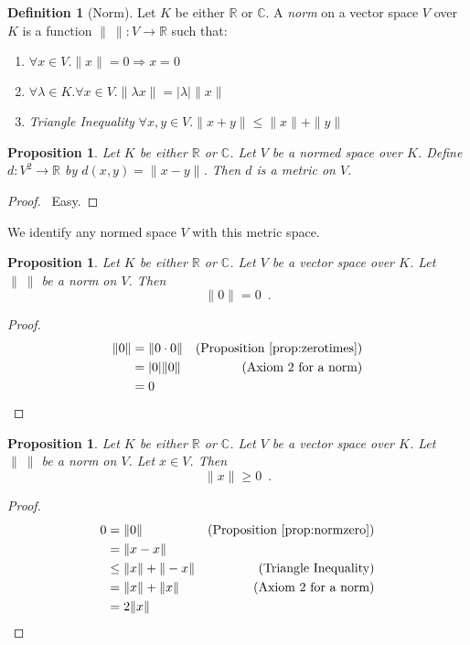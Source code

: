 \documentclass{book}
\let\qed\relax
\newtheorem{prop}[ax]{Proposition}
\theoremstyle{definition}
\newtheorem{df}[ax]{Definition}
\begin{document}
\begin{df}[Norm]
Let $K$ be either $\mathbb{R}$ or $\mathbb{C}$.
A \emph{norm} on a vector space $V$ over $K$ is a function $\| \ \| : V \rightarrow \mathbb{R}$ such that:
\begin{enumerate}
\item $\forall x \in V. \| x \| = 0 \Rightarrow x = 0$
\item $\forall \lambda \in K. \forall x \in V. \| \lambda x \| = |\lambda| \| x \|$
\item \emph{Triangle Inequality} $\forall x,y \in V. \| x + y \| \leq \| x \| + \| y \|$
\end{enumerate}
\end{df}

\begin{prop}
Let $K$ be either $\mathbb{R}$ or $\mathbb{C}$. Let $V$ be a normed space over $K$. Define $d : V^2 \rightarrow \mathbb{R}$ by $d(x,y) = \| x-y \|$. Then $d$ is a metric on $V$.
\end{prop}

\begin{proof}
\pf\ Easy. \qed
\end{proof}

We identify any normed space $V$ with this metric space.

\begin{prop}
\label{prop:normzero}
Let $K$ be either $\mathbb{R}$ or $\mathbb{C}$. Let $V$ be a vector space over $K$. Let $\|\ \|$ be a norm on $V$. Then
\[ \| 0 \| = 0 \enspace . \]
\end{prop}

\begin{proof}
\pf
\begin{align*}
\| 0 \| & = \| 0 \cdot 0 \| & (\text{Proposition \ref{prop:zerotimes}}) \\
& = |0| \| 0 \| & (\text{Axiom 2 for a norm}) \\
& = 0 & \qed
\end{align*}
\end{proof}

\begin{prop}
Let $K$ be either $\mathbb{R}$ or $\mathbb{C}$. Let $V$ be a vector space over $K$. Let $\|\ \|$ be a norm on $V$. Let $x \in V$. Then
\[ \| x \| \geq 0 \enspace . \]
\end{prop}

\begin{proof}
\pf
\begin{align*}
0 & = \| 0 \| &  (\text{Proposition \ref{prop:normzero}}) \\
& = \| x - x \| \\
& \leq \| x \| + \| - x \| & (\text{Triangle Inequality}) \\
& = \| x \| + \| x \| & (\text{Axiom 2 for a norm}) \\
& = 2 \| x\| & \qed
\end{align*}
\end{proof}
\end{document}
